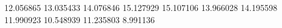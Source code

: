 12.056865
13.035433
14.076846
15.127929
15.107106
13.966028
14.195598
11.990923
10.548939
11.235803
8.991136
